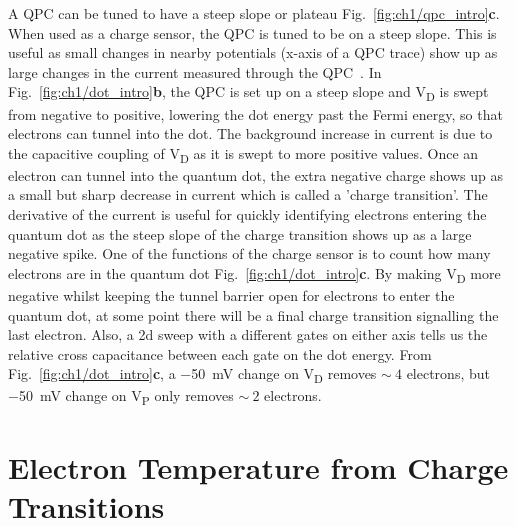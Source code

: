 A QPC can be tuned to have a steep slope or plateau Fig.~\ref{fig:ch1/qpc_intro}\textbf{c}. When used as a charge sensor, the QPC is tuned to be on a steep slope. This is useful as small changes in nearby potentials (x-axis of a QPC trace) show up as large changes in the current measured through the QPC~\cite{cs_design}. In Fig.~\ref{fig:ch1/dot_intro}\textbf{b}, the QPC is set up on a steep slope and V\textsubscript{D} is swept from negative to positive, lowering the dot energy past the Fermi energy, so that electrons can tunnel into the dot. The background increase in current is due to the capacitive coupling of V\textsubscript{D} as it is swept to more positive values. Once an electron can tunnel into the quantum dot, the extra negative charge shows up as a small but sharp decrease in current which is called a 'charge transition'. The derivative of the current is useful for quickly identifying electrons entering the quantum dot as the steep slope of the charge transition shows up as a large negative spike. One of the functions of the charge sensor is to count how many electrons are in the quantum dot Fig.~\ref{fig:ch1/dot_intro}\textbf{c}. By making V\textsubscript{D} more negative whilst keeping the tunnel barrier open for electrons to enter the quantum dot, at some point there will be a final charge transition signalling the last electron. Also, a 2d sweep with a different gates on either axis tells us the relative cross capacitance between each gate on the dot energy. From Fig.~\ref{fig:ch1/dot_intro}\textbf{c}, a \qty{-50}{mV} change on V\textsubscript{D} removes $\sim~4$ electrons, but \qty{-50}{mV} change on V\textsubscript{P} only removes $\sim~2$ electrons.



\section{Electron Temperature from Charge Transitions}


